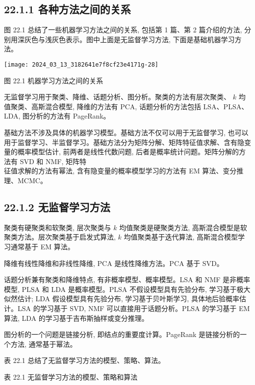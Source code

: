 \documentclass[10pt]{article}
\begin{document}
\begin{CJK*}{UTF8}{bsmi}
\subsection*{22.1.1 各种方法之间的关系}
图 22.1 总结了一些机器学习方法之间的关系, 包括第 1 篇、第 2 篇介绍的方法, 分别用深灰色与浅灰色表示。图中上面是无监督学习方法, 下面是基础机器学习方法。

\begin{center}
\texttt{[image: 2024\_03\_13\_3182641e7f8cf23e4171g-28]}
\end{center}

图 22.1 机器学习方法之间的关系

无监督学习用于聚类、降维、话题分析、图分析。聚类的方法有层次聚类、 $k$ 均值聚类、高斯混合模型, 降维的方法有 PCA, 话题分析的方法包括 LSA、PLSA、LDA, 图分析的方法有 PageRank。

基础方法不涉及具体的机器学习模型。基础方法不仅可以用于无监督学习, 也可以用于监督学习、半监督学习。基础方法分为矩阵分解、矩阵特征值求解、含有隐变量的概率模型估计, 前两者是线性代数问题, 后者是概率统计问题。矩阵分解的方法有 SVD 和 NMF, 矩阵特\\
征值求解的方法有幂法, 含有隐变量的概率模型学习的方法有 EM 算法、变分推理、MCMC。

\subsection*{22.1.2 无监督学习方法}
聚类有硬聚类和软聚类, 层次聚类与 $k$ 均值聚类是硬聚类方法, 高斯混合模型是软聚类方法。层次聚类基于启发式算法, $k$ 均值聚类基于迭代算法, 高斯混合模型学习通常基于 EM 算法。

降维有线性降维和非线性降维, PCA 是线性降维方法。PCA 基于 SVD。

话题分析兼有聚类和降维特点, 有非概率模型、概率模型。LSA 和 NMF 是非概率模型, PLSA 和 LDA 是概率模型。PLSA 不假设模型具有先验分布, 学习基于极大似然估计; LDA 假设模型具有先验分布, 学习基于贝叶斯学习, 具体地后验概率估计。LSA 的学习基于 SVD, NMF 可以直接用于话题分析。PLSA 的学习基于 EM 算法, LDA 的学习基于吉布斯抽样或变分推理。

图分析的一个问题是链接分析, 即结点的重要度计算。PageRank 是链接分析的一个方法, 通常基于幂法。

表 22.1 总结了无监督学习方法的模型、策略、算法。

表 22.1 无监督学习方法的模型、策略和算法


\end{CJK*}
\end{document}
